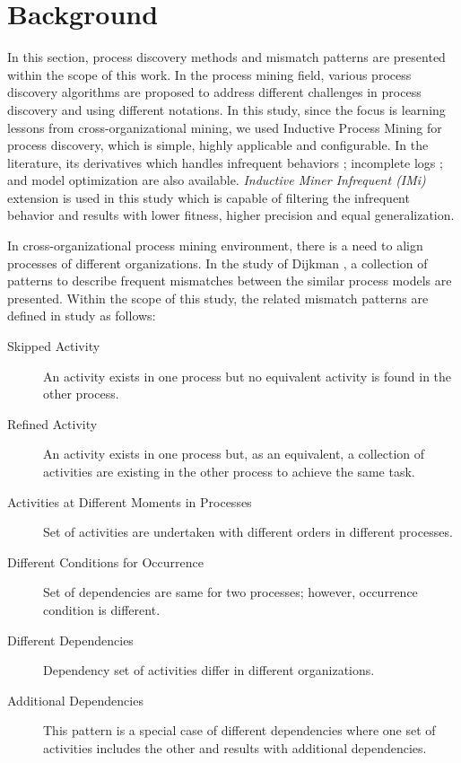 \section{Background}
\label{sec:background}

In this section, process discovery methods and mismatch patterns are presented within the scope of this work. In the process mining field, various process discovery algorithms are proposed to address different challenges in process discovery and using different notations. In this study, since the focus is learning lessons from cross-organizational mining, we used Inductive Process Mining \cite{leemans2013discovering} for process discovery, which is simple, highly applicable and configurable. In the literature, its derivatives which handles infrequent behaviors \cite{leemans2014discoveringinfrequent}; incomplete logs \cite{leemans2014discoveringincomplete}; and model optimization \cite{weidlich2012profiles} are also available. \textit{Inductive Miner Infrequent (IMi)} \cite{leemans2014discoveringinfrequent} extension is used in this study which is capable of filtering the infrequent behavior and results with lower fitness, higher precision and equal generalization.

In cross-organizational process mining environment, there is a need to align processes of different organizations. In the study of Dijkman \cite{dijkman2007mismatch}, a collection of patterns to describe frequent mismatches between the similar process models are presented. Within the scope of this study, the related mismatch patterns are defined in study \cite{dijkman2007mismatch} as follows:
\begin{description}
  \item[Skipped Activity] An activity exists in one process but no equivalent activity is found in the other process.
  \item[Refined Activity] An activity exists in one process but, as an equivalent, a collection of activities are existing in the other process to achieve the same task.
  \item[Activities at Different Moments in Processes] Set of activities are undertaken with different orders in different processes.
  \item[Different Conditions for Occurrence] Set of dependencies are same for two processes; however, occurrence condition is different.
  \item[Different Dependencies] Dependency set of activities differ in different organizations.
  \item[Additional Dependencies] This pattern is a special case of different dependencies where one set of activities includes the other and results with additional dependencies.
\end{description}

